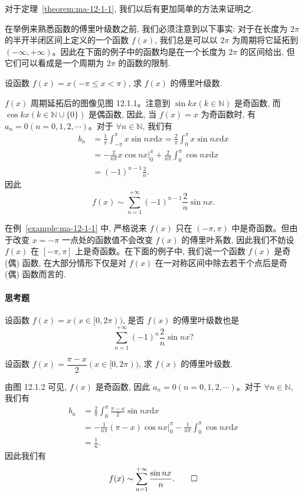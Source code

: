对于定理~\ref{theorem:ma-12-1-1}, 我们以后有更加简单的方法来证明之.

在举例来熟悉函数的傅里叶级数之前, 我们必须注意到以下事实: 对于在长度为 $2\pi$ 的半开半闭区间上定义的一个函数 $f(x)$, 我们总是可以以 $2\pi$ 为周期将它延拓到 $(-\infty,+\infty)$。因此在下面的例子中的函数均是在一个长度为 $2\pi$ 的区间给出, 但它们可以看成是一个周期为 $2\pi$ 的函数的限制.

\begin{example}\label{example:ma-12-1-1}
设函数 $f(x)=x(-\pi\leqslant x<\pi)$, 求 $f(x)$ 的傅里叶级数.
\end{example}


\begin{solve}
$f(x)$ 周期延拓后的图像见图 12.1.1。注意到 $\sin kx(k\in\mathbb N)$ 是奇函数, 而 $\cos kx(k\in\mathbb N\cup\{0\})$ 是偶函数, 因此, 当 $f(x)=x$ 为奇函数时, 有 $a_n=0(n=0,1,2,\cdots)$。对于 $\forall n\in\mathbb N$, 我们有
\[
\begin{aligned}
  b_n
  &=\frac1\pi\int_{-\pi}^{\pi}x\sin nx\mathrm dx
  =\frac2\pi\int_0^\pi x\sin nx\mathrm dx\\
  &=-\frac2{n\pi}x\cos nx\bigg|_0^\pi+\frac2{n\pi}\int_0^\pi\cos nx\mathrm dx\\
  &=(-1)^{n-1}\frac2n.
\end{aligned}
\]
因此
\[
  f(x)\sim\sum_{n=1}^{+\infty}(-1)^{n-1}\frac2n\sin nx.
\]

在例~\ref{example:ma-12-1-1} 中, 严格说来 $f(x)$ 只在 $(-\pi,\pi)$ 中是奇函数。但由于改变 $x=-\pi$ 一点处的函数值不会改变 $f(x)$ 的傅里叶系数, 因此我们不妨设 $f(x)$ 在 $[-\pi,\pi]$ 上是奇函数。在下面的例子中, 我们说一个函数 $f(x)$ 是奇 (偶) 函数, 在大部分情形下仅是对 $f(x)$ 在一对称区间中除去若干个点后是奇 (偶) 函数而言的.
\end{solve}


\paragraph*{思考题}
设函数 $f(x)=x(x\in[0,2\pi))$, 是否 $f(x)$ 的傅里叶级数也是
\[
  \sum_{n=1}^{+\infty}(-1)^n\frac2n\sin nx?
\]

\begin{example}\label{example:ma-12-1-2}
设函数 $f(x)=\dfrac{\pi-x}{2}(x\in[0,2\pi))$, 求 $f(x)$ 的傅里叶级数.
\end{example}


\begin{solve}
由图 12.1.2 可见, $f(x)$ 是奇函数, 因此 $a_n=0(n=0,1,2,\cdots)$。对于 $\forall n\in\mathbb N$, 我们有
\[
\begin{aligned}
  b_n
  &=\frac2\pi\int_0^\pi\frac{\pi-x}{2}\sin nx\mathrm dx\\
  &=-\frac1{n\pi}(\pi-x)\cos nx\bigg|_0^\pi
    -\frac1{n\pi}\int_0^\pi\cos nx\mathrm dx\\
  &=\frac1n.
\end{aligned}
\]
因此我们有
\[
  f(x)\sim\sum_{n=1}^{+\infty}\frac{\sin nx}{n}.
\qedhere
\]
\end{solve}


